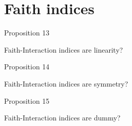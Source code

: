 \documentclass[10pt]{beamer}
\begin{document}
\section[Faith interaction index]{Faith indices}
\begin{frame}{Proposition 13}
    \begin{myaxiombox}{Faith-Interaction indices are linearity?}
        
    \end{myaxiombox}
\end{frame}
\begin{frame}{Proposition 14}
    \begin{myaxiombox}{Faith-Interaction indices are symmetry?}
        
    \end{myaxiombox}
\end{frame}
\begin{frame}{Proposition 15}
    \begin{myaxiombox}{Faith-Interaction indices are dummy?}
        
    \end{myaxiombox}
\end{frame}
\begin{frame}
    
\end{frame}
\begin{frame}
    
\end{frame}
\begin{frame}
    
\end{frame}
\begin{frame}
    
\end{frame}
\begin{frame}
    
\end{frame}
\begin{frame}
    
\end{frame}
\begin{frame}
    
\end{frame}
\end{document}
